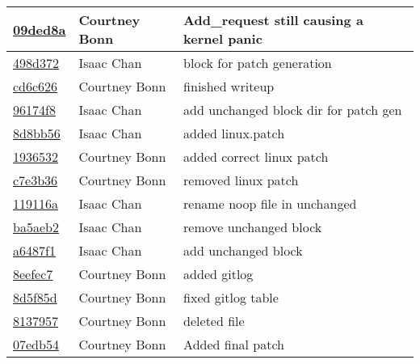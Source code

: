 \documentclass[letterpaper,10pt,draftclsnofoot,onecolumn,titlepage]{IEEEtran}
\begin{document}
\begin{tabular}{p{2cm} p{3cm} p{12cm}}
\href{https://github.com/courtbonn/CS-444/commit/09ded8afcdf70a8b47e7035542c62d93e76d51dd}{09ded8a} & Courtney Bonn & Add\_request still causing a kernel panic\\\hline
\href{https://github.com/courtbonn/CS-444/commit/498d37252ce619ec5b677dfd70ea2dd315daae75}{498d372} & Isaac Chan & block for patch generation\\\hline
\href{https://github.com/courtbonn/CS-444/commit/cd6c6269ddabeed3e7a761cc42041564bff86d4f}{cd6c626} & Courtney Bonn & finished writeup\\\hline
\href{https://github.com/courtbonn/CS-444/commit/96174f8ba4be80b2cb15a629ad468998537600ea}{96174f8} & Isaac Chan & add unchanged block dir for patch gen\\\hline
\href{https://github.com/courtbonn/CS-444/commit/8d8bb56c6b4e6287ad20283cba4560f59e3e21dd}{8d8bb56} & Isaac Chan & added linux.patch\\\hline
\href{https://github.com/courtbonn/CS-444/commit/193653232e83d3b72dab544abc48d95c78bb2e2c}{1936532} & Courtney Bonn & added correct linux patch\\\hline
\href{https://github.com/courtbonn/CS-444/commit/c7e3b36a90dc324a0bd24af5bbebe27b8f2cd352}{c7e3b36} & Courtney Bonn & removed linux patch\\\hline
\href{https://github.com/courtbonn/CS-444/commit/119116a604998aba96ad0479b6309bbd25d10019}{119116a} & Isaac Chan & rename noop file in unchanged\\\hline
\href{https://github.com/courtbonn/CS-444/commit/ba5aeb22ab9d21ca25fc05605a65288d43e52762}{ba5aeb2} & Isaac Chan & remove unchanged block\\\hline
\href{https://github.com/courtbonn/CS-444/commit/a6487f178233ac6144fa2a78a63e717e829cbdce}{a6487f1} & Isaac Chan & add unchanged block\\\hline
\href{https://github.com/courtbonn/CS-444/commit/8eefec7e7192a315187096ef6310651fd8d7ed21}{8eefec7} & Courtney Bonn & added gitlog\\\hline
\href{https://github.com/courtbonn/CS-444/commit/8d5f85d6b91eb9041debcfe5b93c4224f5cdfee6}{8d5f85d} & Courtney Bonn & fixed gitlog table\\\hline
\href{https://github.com/courtbonn/CS-444/commit/8137957ba4bd705a41ce04a7f5c05180a4d28728}{8137957} & Courtney Bonn & deleted file\\\hline
\href{https://github.com/courtbonn/CS-444/commit/07edb5461a1b433e43a0e1c4a9a4ba0cd2e9a126}{07edb54} & Courtney Bonn & Added final patch\\\hline\end{tabular}
\end{document}

